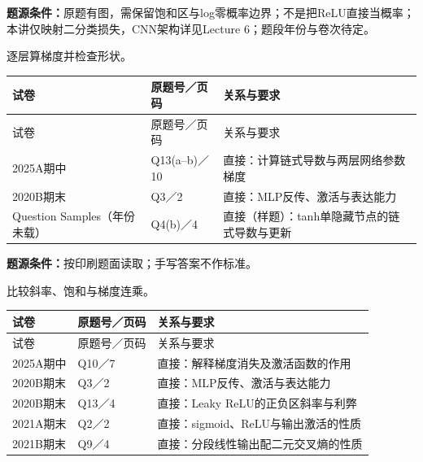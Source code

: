 \textbf{题源条件：}原题有图，需保留饱和区与log零概率边界；不是把ReLU直接当概率；本讲仅映射二分类损失，CNN架构详见Lecture 6；题段年份与卷次待定。



逐层算梯度并检查形状。

\begingroup\small\setlength{\tabcolsep}{3pt}\renewcommand{\arraystretch}{1.22}
\begin{longtable}{@{}>{\raggedright\arraybackslash}p{}>{\raggedright\arraybackslash}p{}>{\raggedright\arraybackslash}p{}@{}}
\toprule
试卷 & 原题号／页码 & 关系与要求 \\
\midrule\endfirsthead
试卷 & 原题号／页码 & 关系与要求 \\
\midrule\endhead
\bottomrule\endfoot
2025A期中 & Q13(a–b)／10 & 直接：计算链式导数与两层网络参数梯度 \\
2020B期末 & Q3／2 & 直接：MLP反传、激活与表达能力 \\
Question Samples（年份未载） & Q4(b)／4 & 直接（样题）：tanh单隐藏节点的链式导数与更新 \\
\end{longtable}\endgroup

\textbf{题源条件：}按印刷题面读取；手写答案不作标准。



比较斜率、饱和与梯度连乘。

\begingroup\small\setlength{\tabcolsep}{3pt}\renewcommand{\arraystretch}{1.22}
\begin{longtable}{@{}>{\raggedright\arraybackslash}p{}>{\raggedright\arraybackslash}p{}>{\raggedright\arraybackslash}p{}@{}}
\toprule
试卷 & 原题号／页码 & 关系与要求 \\
\midrule\endfirsthead
试卷 & 原题号／页码 & 关系与要求 \\
\midrule\endhead
\bottomrule\endfoot
2025A期中 & Q10／7 & 直接：解释梯度消失及激活函数的作用 \\
2020B期末 & Q3／2 & 直接：MLP反传、激活与表达能力 \\
2020B期末 & Q13／4 & 直接：Leaky ReLU的正负区斜率与利弊 \\
2021A期末 & Q2／2 & 直接：sigmoid、ReLU与输出激活的性质 \\
2021B期末 & Q9／4 & 直接：分段线性输出配二元交叉熵的性质 \\
\end{longtable}\endgroup


